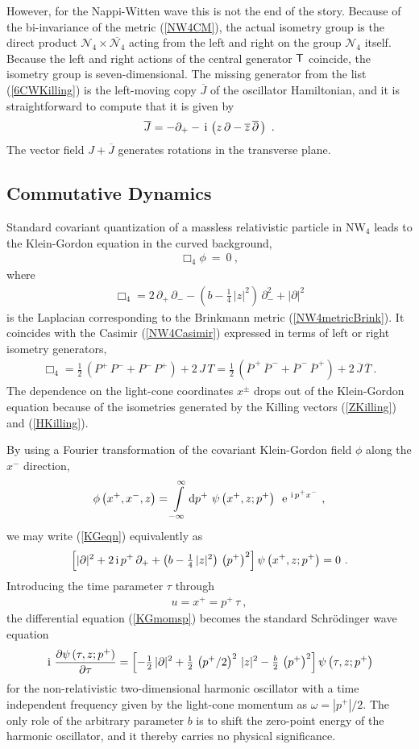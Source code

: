 \documentclass[11pt,a4paper]{article}
\newcommand{\ii}{{\rm i}}
\def\ii{{\,{\rm i}\,}}
\def\dd{{\rm d}}
\def\T{{\sf T}}
\def\e{{\,\rm e}\,}
\newcommand{\beq}{\begin{eqnarray}}
\newcommand{\eeq}{\end{eqnarray}}
\begin{document}
However, for the Nappi-Witten wave this is not the end of the
story. Because of the bi-invariance of the metric (\ref{NW4CM}), the
actual isometry group is the direct product $\mathcal
N_4\times\overline{\mathcal N_4}$ acting from the left and right on
the group $\mathcal N_4$ itself. Because the left and right actions of
the central generator $\T$ coincide, the isometry group is
seven-dimensional. The missing generator from the list
(\ref{6CWKilling}) is the left-moving copy $\overline{J}$ of the
oscillator Hamiltonian, and it is straightforward to compute that it
is given by
\beq
\overline{J}=-\partial_+-\ii\left(z\,\partial-\overline{z}\,
\overline{\partial}\,\right) \ .
\label{extraHKilling}\eeq
The vector field $J+\overline{J}$ generates rotations in the
transverse plane.

\subsection{Commutative Dynamics \label{Dynamics}}

Standard covariant quantization of a massless relativistic particle in
NW$_4$ leads to the Klein-Gordon equation in the curved background,
\beq
\Box_4\phi~=~0 \ ,
\label{KGeqn}\eeq
where
\beq
\Box_4=2\,\partial_+\,\partial_--\left(b-\mbox{$\frac14$}\,|z|^2\right)\,
\partial_-^2+|\partial|^2
\label{BoxNW4def}\eeq
is the Laplacian corresponding to the Brinkmann metric
(\ref{NW4metricBrink}). It coincides with the Casimir
(\ref{NW4Casimir}) expressed in terms of left or right isometry
generators,
\beq
\Box_4=\mbox{$\frac12$}\,\left(P^+\,P^-+P^-\,P^+\right)+2\,J\,T=
\mbox{$\frac12$}\,\left(
\overline{P}^{\,+}\,\overline{P}^{\,-}+\overline{P}^{\,-}\,\overline{P}^{\,+}
\right)+2\,\overline{J}\,\overline{T} \ .
\label{BoxCasimirNW4}\eeq
The dependence on the light-cone coordinates $x^\pm$ drops out of
the Klein-Gordon equation because of the isometries generated by the
Killing vectors (\ref{ZKilling}) and (\ref{HKilling}).

By using a Fourier transformation of the covariant Klein-Gordon field
$\phi$ along the $x^-$ direction,
\beq
\phi\left(x^+,x^-,z\right)=\int\limits_{-\infty}^\infty
\dd p^+~\psi\left(x^+,z;p^+\right)~\e^{\ii p^+x^-} \ ,
\label{KGphiFT}\eeq
we may write (\ref{KGeqn}) equivalently as
\beq
\left[|\partial|^2+2\ii p^+\,\partial_++\left(b-
\mbox{$\frac14$}\,|z|^2\right)\,\left(p^+\right)^2\right]\psi\left(x^+,z
;p^+\right)=0 \ .
\label{KGmomsp}\eeq
Introducing the time parameter $\tau$ through
\beq
u=x^+=p^+\,\tau \ ,
\label{utaudef}\eeq
the differential equation (\ref{KGmomsp}) becomes the standard
Schr\"odinger wave equation
\beq
\ii\,\frac{\partial\psi\left(\tau,z;p^+\right)}{\partial\tau}=
\left[-\mbox{$\frac12$}\,|\partial|^2+\mbox{$\frac12$}\,\left(p^+/2\right)^2\,
|z|^2-\mbox{$\frac b2$}\,\left(p^+\right)^2\right]\psi\left(\tau,z;p^+\right)
\label{SchHO}\eeq
for the non-relativistic two-dimensional harmonic oscillator with a
time independent frequency given by the light-cone momentum as
$\omega=|p^+|/2$. The only role of the arbitrary parameter $b$ is to
shift the zero-point energy of the harmonic oscillator, and it thereby
carries no physical significance.
\end{document}
